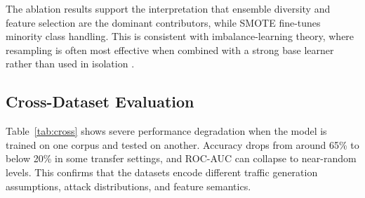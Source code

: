 \documentclass[conference]{IEEEtran}
\begin{document}
\begin{table}[htbp]
\caption{Ablation Study on the Proposed Pipeline.}
\label{tab:ablation}
\centering
{}
\end{table}

The ablation results support the interpretation that ensemble diversity and feature selection are the dominant contributors, while SMOTE fine-tunes minority class handling. This is consistent with imbalance-learning theory, where resampling is often most effective when combined with a strong base learner rather than used in isolation \cite{chawla2002smote,he2009learning}.

\subsection{Cross-Dataset Evaluation}
Table~\ref{tab:cross} shows severe performance degradation when the model is trained on one corpus and tested on another. Accuracy drops from around 65\% to below 20\% in some transfer settings, and ROC-AUC can collapse to near-random levels. This confirms that the datasets encode different traffic generation assumptions, attack distributions, and feature semantics.

\begin{table}[htbp]
\caption{Cross-Dataset Evaluation of the Proposed Ensemble.}
\label{tab:cross}
\centering
{}
\end{table}
\end{document}
